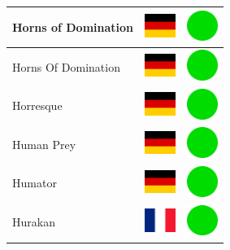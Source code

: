 \documentclass[12pt, a4paper, twoside]{report}
\begin{document}
\begin{center}
\begin{longtable}{|p{5cm}|p{2cm}|p{2cm}|}
Horns of Domination & \includegraphics[width=1cm]{4x3/de} & \includegraphics[width=1cm]{likes/y} \\ \hline
Horns Of Domination & \includegraphics[width=1cm]{4x3/de} & \includegraphics[width=1cm]{likes/y} \\ \hline
Horresque & \includegraphics[width=1cm]{4x3/de} & \includegraphics[width=1cm]{likes/y} \\ \hline
Human Prey & \includegraphics[width=1cm]{4x3/de} & \includegraphics[width=1cm]{likes/y} \\ \hline
Humator & \includegraphics[width=1cm]{4x3/de} & \includegraphics[width=1cm]{likes/y} \\ \hline
Hurakan & \includegraphics[width=1cm]{4x3/fr} & \includegraphics[width=1cm]{likes/y} \\ \hline

\end{longtable}
\end{center}
\end{document}

